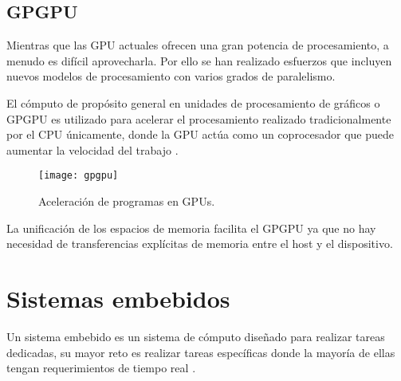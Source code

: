 
    \subsection{GPGPU}
    
    Mientras que las GPU actuales ofrecen una gran potencia de procesamiento, a menudo es difícil aprovecharla. Por ello se han realizado esfuerzos que incluyen nuevos modelos de procesamiento con varios grados de paralelismo.
    \newline
   
    El cómputo  de propósito general en unidades de procesamiento de gráficos o GPGPU es utilizado para acelerar el procesamiento realizado tradicionalmente por el CPU únicamente, donde la GPU actúa como un coprocesador que puede aumentar la velocidad del trabajo \cite{GpuCpu}.
    
     \begin{figure}[ht]
      \centering
        \texttt{[image: gpgpu]}
        \caption{Aceleración de programas en GPUs\cite{gpgpu}.}
        \label{fig:gpgpu}
    \end{figure}
                
   \vspace{0.3cm}
   
    La unificación de los espacios de memoria facilita el GPGPU ya que no hay necesidad de transferencias explícitas de memoria entre el host y el dispositivo.
    
    \section{Sistemas embebidos}

    Un sistema embebido es un sistema de cómputo diseñado para realizar tareas dedicadas, su mayor reto es realizar tareas específicas donde la mayoría de ellas tengan requerimientos de tiempo real \cite{LimPree}.


